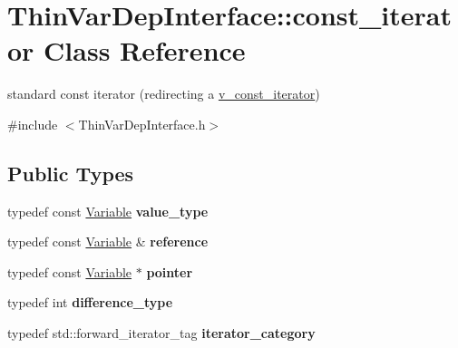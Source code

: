 \hypertarget{class_s_m_spp__di__unipi__it_1_1_thin_var_dep_interface_1_1const__iterator}{}\section{Thin\+Var\+Dep\+Interface\+:\+:const\+\_\+iterator Class Reference}
\label{class_s_m_spp__di__unipi__it_1_1_thin_var_dep_interface_1_1const__iterator}


standard const iterator (redirecting a \mbox{\hyperlink{class_s_m_spp__di__unipi__it_1_1_thin_var_dep_interface_1_1v__const__iterator}{v\+\_\+const\+\_\+iterator}})  




{\ttfamily \#include $<$Thin\+Var\+Dep\+Interface.\+h$>$}

\subsection*{Public Types}
\begin{DoxyCompactItemize}
\item 
typedef const \mbox{\hyperlink{class_s_m_spp__di__unipi__it_1_1_variable}{Variable}} {\bfseries value\+\_\+type}
\item 
typedef const \mbox{\hyperlink{class_s_m_spp__di__unipi__it_1_1_variable}{Variable}} \& {\bfseries reference}
\item 
typedef const \mbox{\hyperlink{class_s_m_spp__di__unipi__it_1_1_variable}{Variable}} $\ast$ {\bfseries pointer}
\item 
typedef int {\bfseries difference\+\_\+type}
\item 
typedef std\+::forward\+\_\+iterator\+\_\+tag {\bfseries iterator\+\_\+category}
\end{DoxyCompactItemize}
